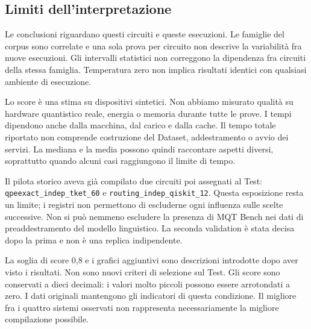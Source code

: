 \subsection{Limiti dell'interpretazione}
Le conclusioni riguardano questi circuiti e queste esecuzioni. Le famiglie
del corpus sono correlate e una sola prova per circuito non descrive la
variabilità fra nuove esecuzioni. Gli intervalli statistici non correggono
la dipendenza fra circuiti della stessa famiglia. Temperatura zero non implica
risultati identici con qualsiasi ambiente di esecuzione.

Lo score è una stima su dispositivi sintetici. Non abbiamo misurato qualità
su hardware quantistico reale, energia o memoria durante tutte le prove.
I tempi dipendono anche dalla macchina, dal carico e dalla cache.
Il tempo totale riportato non comprende costruzione del Dataset,
addestramento o avvio dei servizi. La mediana e la media possono quindi
raccontare aspetti diversi, soprattutto quando alcuni casi raggiungono il
limite di tempo.

Il pilota storico aveva già compilato due circuiti poi assegnati al Test:
\texttt{qpeexact\_indep\_tket\_60} e
\texttt{routing\_indep\_qiskit\_12}. Questa esposizione resta un limite;
i registri non permettono di escluderne ogni influenza sulle scelte successive.
Non si può nemmeno escludere la presenza di MQT Bench nei dati di
preaddestramento del modello linguistico. La seconda validation è stata
decisa dopo la prima e non è una replica indipendente.

La soglia di score 0,8 e i grafici aggiuntivi sono descrizioni introdotte
dopo aver visto i risultati. Non sono nuovi criteri di selezione sul Test.
Gli score sono conservati a dieci decimali: i valori molto piccoli possono
essere arrotondati a zero. I dati originali mantengono gli indicatori di questa
condizione. Il migliore fra i quattro sistemi osservati non rappresenta
necessariamente la migliore compilazione possibile.

